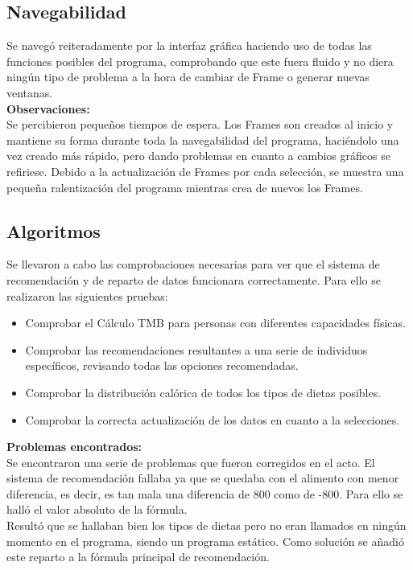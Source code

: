 \subsection{Navegabilidad}
Se navegó reiteradamente por la interfaz gráfica haciendo uso de todas las funciones posibles del programa, comprobando que este fuera fluido y no diera ningún tipo de problema a la hora de cambiar de Frame o generar nuevas ventanas.\\

\textbf{Observaciones:}\\
Se percibieron pequeños tiempos de espera. Los Frames son creados al inicio y mantiene su forma durante toda la navegabilidad del programa, haciéndolo una vez creado más rápido, pero dando problemas en cuanto a cambios gráficos se refiriese. Debido a la actualización de Frames por cada selección, se muestra una pequeña ralentización del programa mientras crea de nuevos los Frames.
\subsection{Algoritmos}
Se llevaron a cabo las comprobaciones necesarias para ver que el sistema de recomendación y de reparto de datos funcionara correctamente. Para ello se realizaron las siguientes pruebas:
\begin{itemize}
\item Comprobar el Cálculo TMB para personas con diferentes capacidades físicas.
\item Comprobar las recomendaciones resultantes a una serie de individuos específicos, revisando todas las opciones recomendadas.
\item Comprobar la distribución calórica de todos los tipos de dietas posibles.
\item Comprobar la correcta actualización de los datos en cuanto a la selecciones.
\end{itemize}
\textbf{Problemas encontrados:}\\
Se encontraron una serie de problemas que fueron corregidos en el acto. El sistema de recomendación fallaba ya que se quedaba con el alimento con menor diferencia, es decir, es tan mala una diferencia de 800 como de -800. Para ello se halló el valor absoluto de la fórmula.\\
Resultó que se hallaban bien los tipos de dietas pero no eran llamados en ningún momento en el programa, siendo un programa estático. Como solución se añadió este reparto a la fórmula principal de recomendación.
